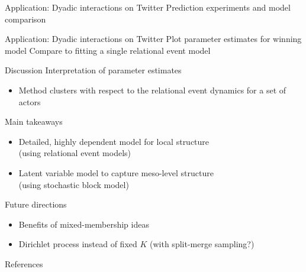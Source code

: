 \documentclass{beamer}
\begin{document}
\begin{frame}{Application: Dyadic interactions on Twitter}
Prediction experiments and model comparison
\end{frame}

\begin{frame}{Application: Dyadic interactions on Twitter}
Plot parameter estimates for winning model
Compare to fitting a single relational event model
\end{frame}

\begin{frame}{Discussion}
Interpretation of parameter estimates
  \begin{itemize}
  \item Method clusters with respect to the relational event dynamics for a set of actors
  \end{itemize}

Main takeaways
\begin{itemize}
\item Detailed, highly dependent model for local structure\\ (using relational event models)
\item Latent variable model to capture meso-level structure \\(using stochastic block model)
\end{itemize}
\end{frame}

\begin{frame}{Future directions}
  \begin{itemize}
  \item Benefits of mixed-membership ideas
  \item Dirichlet process instead of fixed $K$ (with split-merge sampling?)
  \end{itemize}
\end{frame}

\begin{frame}{References}
  
\end{frame}
\end{document}
